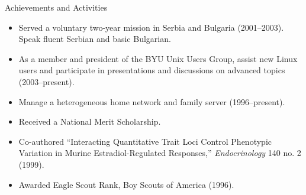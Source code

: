 \documentclass[11pt,oneside]{article}
\newenvironment{ressection}[1]{
	\vspace{4pt}
	{\fontfamily{phv}\selectfont\Large#1}
	\begin{itemize}
	\vspace{3pt}
}{
	\end{itemize}
}
\newcommand{\resitem}[1]{
	\vspace{-4pt}
	\item \begin{flushleft} #1 \end{flushleft}
}
\newcommand{\ressubitem}[1]{
	\vspace{-1pt}
	\item \begin{flushleft} #1 \end{flushleft}
}
\newcommand{\resbigitem}[3]{
	\vspace{-5pt}
	\item
	\textbf{#1}---#2 \\
	\textit{#3}
}
\newenvironment{ressubsec}[3]{
	\resbigitem{#1}{#2}{#3}
	\vspace{-2pt}
	\begin{itemize}
}{
	\end{itemize}
}
\newenvironment{reslist}[1]{
	\resitem{\textbf{#1}}
	\vspace{-5pt}
	\begin{itemize}
}{
	\end{itemize}
}
\begin{document}









\begin{ressection}{Achievements and Activities}

	\resitem{Served a voluntary two-year mission in Serbia and Bulgaria (2001--2003).  Speak fluent Serbian and basic Bulgarian.}

	\resitem{As a member and president of the BYU Unix Users Group, assist new Linux users and participate in presentations and discussions on advanced topics (2003--present).}

	\resitem{Manage a heterogeneous home network and family server (1996--present).}

	\resitem{Received a National Merit Scholarship.}

	\resitem{Co-authored ``Interacting Quantitative Trait Loci Control Phenotypic Variation in Murine Estradiol-Regulated Responses,'' \textit{Endocrinology} 140 no. 2 (1999).}

	\resitem{Awarded Eagle Scout Rank, Boy Scouts of America (1996).}


\end{ressection}
\end{document}
